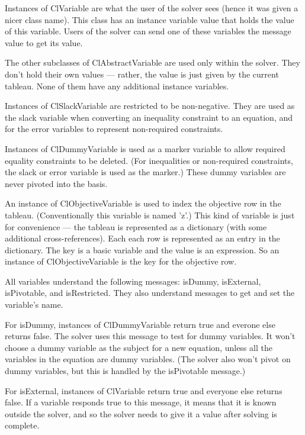 \documentclass{article}
\begin{document}
Instances of {\sf ClVariable} are what the user of the solver sees (hence
it was given a nicer class name).  This class has an instance variable
{\sf value} that holds the value of this variable.  Users of the solver can
send one of these variables the message {\sf value} to get its value.

The other subclasses of {\sf ClAbstractVariable} are used only within the
solver.  They don't hold their own values --- rather, the value is just
given by the current tableau.  None of them have any additional instance
variables.

Instances of {\sf ClSlackVariable} are restricted to be non-negative.  They
are used as the slack variable when converting an inequality constraint to
an equation, and for the error variables to represent non-required constraints.

Instances of {\sf ClDummyVariable} is used as a marker variable to allow
required equality constraints to be deleted.  (For inequalities or
non-required constraints, the slack or error variable is used as the
marker.)  These dummy variables are never pivoted into the basis.

An instance of {\sf ClObjectiveVariable} is used to index the objective row
in the tableau.  (Conventionally this variable is named 'z'.)  This kind of
variable is just for convenience --- the tableau is represented as a
dictionary (with some additional cross-references).  Each each row is
represented as an entry in the dictionary.  The key is a basic variable and
the value is an expression.  So an instance of {\sf ClObjectiveVariable} is
the key for the objective row.  

All variables understand the following messages: {\sf isDummy}, {\sf
isExternal}, {\sf isPivotable}, and {\sf isRestricted}.  They also
understand messages to get and set the variable's name.

For {\sf isDummy}, instances of {\sf ClDummyVariable} return true and
everone else returns false.  The solver uses this message to test for dummy
variables.  It won't choose a dummy variable as the subject for a new
equation, unless all the variables in the equation are dummy variables.
(The solver also won't pivot on dummy variables, but this is handled by the
{\sf isPivotable} message.)

For {\sf isExternal}, instances of {\sf ClVariable} return true and
everyone else returns false.  If a variable responds true to this message,
it means that it is known outside the solver, and so the solver needs to
give it a value after solving is complete.
\end{document}
